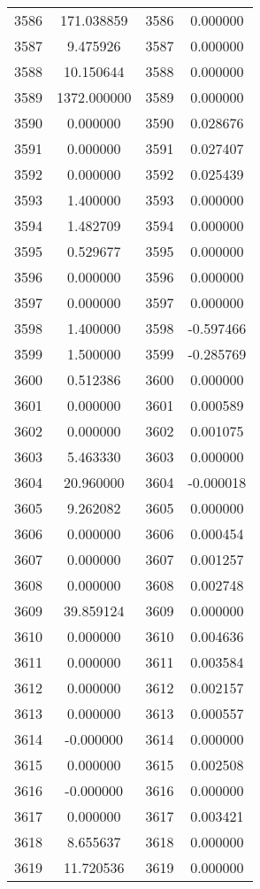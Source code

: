 \documentclass[12pt]{article}
\begin{document}
\begin{longtable}{@{}cccc@{}}
3586 & 171.038859 & 3586 & 0.000000 \\
3587 & 9.475926 & 3587 & 0.000000 \\
3588 & 10.150644 & 3588 & 0.000000 \\
3589 & 1372.000000 & 3589 & 0.000000 \\
3590 & 0.000000 & 3590 & 0.028676 \\
3591 & 0.000000 & 3591 & 0.027407 \\
3592 & 0.000000 & 3592 & 0.025439 \\
3593 & 1.400000 & 3593 & 0.000000 \\
3594 & 1.482709 & 3594 & 0.000000 \\
3595 & 0.529677 & 3595 & 0.000000 \\
3596 & 0.000000 & 3596 & 0.000000 \\
3597 & 0.000000 & 3597 & 0.000000 \\
3598 & 1.400000 & 3598 & -0.597466 \\
3599 & 1.500000 & 3599 & -0.285769 \\
3600 & 0.512386 & 3600 & 0.000000 \\
3601 & 0.000000 & 3601 & 0.000589 \\
3602 & 0.000000 & 3602 & 0.001075 \\
3603 & 5.463330 & 3603 & 0.000000 \\
3604 & 20.960000 & 3604 & -0.000018 \\
3605 & 9.262082 & 3605 & 0.000000 \\
3606 & 0.000000 & 3606 & 0.000454 \\
3607 & 0.000000 & 3607 & 0.001257 \\
3608 & 0.000000 & 3608 & 0.002748 \\
3609 & 39.859124 & 3609 & 0.000000 \\
3610 & 0.000000 & 3610 & 0.004636 \\
3611 & 0.000000 & 3611 & 0.003584 \\
3612 & 0.000000 & 3612 & 0.002157 \\
3613 & 0.000000 & 3613 & 0.000557 \\
3614 & -0.000000 & 3614 & 0.000000 \\
3615 & 0.000000 & 3615 & 0.002508 \\
3616 & -0.000000 & 3616 & 0.000000 \\
3617 & 0.000000 & 3617 & 0.003421 \\
3618 & 8.655637 & 3618 & 0.000000 \\
3619 & 11.720536 & 3619 & 0.000000 \\

\end{longtable}
\end{document}
